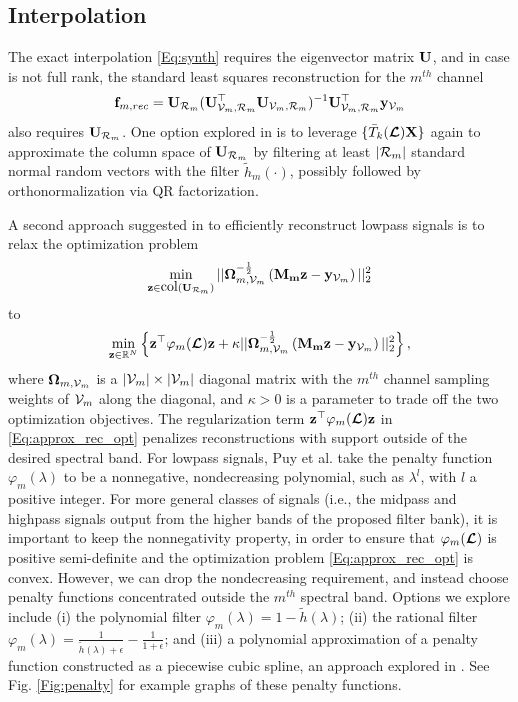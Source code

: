 \documentclass[journal, 10pt]{IEEEtran}
\begin{document}
\subsection{Interpolation}
The exact interpolation \eqref{Eq:synth} requires the eigenvector matrix ${\bf U}$, and in case  is not full rank, the standard least squares reconstruction for the $m^{th}$ channel
\begin{align}
{\bf f}_{m,{rec}}=\mathbf{U}_{{\cal R}_m}(\mathbf{U}_{\V_m,{\cal R}_m}^{\top}\mathbf{U}_{\V_m,{\cal R}_m})^{-1}\mathbf{U}_{\V_m,{\cal R}_m}^{\top}{\bf y}_{\V_m}
\end{align}
also requires ${\bf U}_{{\cal R}_m}$. One option explored in \cite{halko,paratte} is to leverage $\{\bar{T}_k(\boldsymbol{\mathcal{L}}){\bf X}\}$ again to approximate the column space of ${\bf U}_{{\cal R}_m}$ by filtering at least $|{\cal R}_m|$ standard normal random vectors with the filter $\tilde{h}_m(\cdot)$, possibly followed by orthonormalization via QR factorization.


A second approach suggested in \cite{PuyTGV15} to efficiently reconstruct lowpass signals is to relax the optimization problem
\begin{align*}
\min_{{\bf z} \in \hbox{col}({\bf U}_{{\cal R}_m})} ||{\boldsymbol \Omega}_{m,\V_m}^{-\frac{1}{2}}\left({\bf M_m z}-{{\bf y}_{\V_m}} \right) ||_2^2
\end{align*} 
to 
\begin{align}\label{Eq:approx_rec_opt}
\min_{{\bf z} \in \R^N} \left\{{\bf z}^{\top}\varphi_m(\L){\bf z} + \kappa ||{\boldsymbol \Omega}_{m,\V_m}^{-\frac{1}{2}}\left({\bf M_m z}-{{\bf y}_{\V_m}} \right) ||_2^2\right\},
\end{align} 
where ${\boldsymbol \Omega}_{m,{\mathcal{V}}_m}$ is a $|{\mathcal{V}}_m| \times |{\mathcal{V}}_m|$  diagonal matrix with the $m^{th}$ channel sampling weights of ${\mathcal{V}}_m$ along the diagonal, and $\kappa>0$ is a parameter to trade off the two optimization objectives. The regularization term ${\bf z}^{\top}\varphi_m(\boldsymbol{\mathcal{L}}){\bf z}$ in \eqref{Eq:approx_rec_opt} penalizes reconstructions with support outside of the desired spectral band. For lowpass signals, Puy et al. \cite{PuyTGV15} take the penalty function $\varphi_m(\lambda)$ to be a nonnegative, nondecreasing polynomial, such as $\lambda^l$, with $l$ a positive integer. For more general classes of signals (i.e., the midpass and highpass signals output from the higher bands of the proposed filter bank), it is important to keep the nonnegativity property, in order to ensure that $\varphi_m(\boldsymbol{\mathcal{L}})$ is positive semi-definite and the optimization problem \eqref{Eq:approx_rec_opt} is convex. However, we can drop the nondecreasing requirement, and instead choose penalty functions concentrated outside the $m^{th}$ spectral band. Options we explore include (i) the polynomial filter $\varphi_m(\lambda)=1-\tilde{h}(\lambda)$; (ii) the rational filter $\varphi_m(\lambda)=\frac{1}{\tilde{h}(\lambda)+\epsilon}-\frac{1}{1+\epsilon}$; 
and (iii) a polynomial approximation of a penalty function constructed as a piecewise cubic spline, an approach explored in \cite{chen_saad}. See Fig. \ref{Fig:penalty} for example graphs of these penalty functions.
\end{document}
